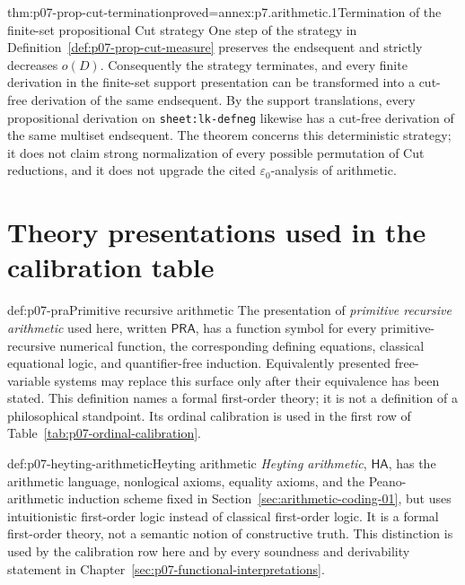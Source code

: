 \begin{hbtheorem}{thm:p07-prop-cut-termination}{proved=annex:p7.arithmetic.1}{Termination of the finite-set propositional Cut strategy}
One step of the strategy in
Definition~\ref{def:p07-prop-cut-measure} preserves the endsequent and strictly
decreases \(o(D)\).  Consequently the strategy terminates, and every finite
derivation in the finite-set support presentation can be transformed into a
cut-free derivation of the same endsequent.  By the support translations, every
propositional derivation on \texttt{sheet:lk-defneg} likewise has a cut-free
derivation of the same multiset endsequent.  The theorem concerns this
deterministic strategy; it does not claim strong normalization of every
possible permutation of Cut reductions, and it does not upgrade the cited
\(\varepsilon_0\)-analysis of arithmetic.
\end{hbtheorem}

\begingroup
\renewcommand{\sectionmark}[1]{\markright{\thesection.\ THEORY PRESENTATIONS}}
\section{Theory presentations used in the calibration table}
\endgroup
\label{sec:p07-calibration-theories}

\begin{hbdefinition}{def:p07-pra}{Primitive recursive arithmetic}
The presentation of \emph{primitive recursive arithmetic} used here, written
\(\mathsf{PRA}\), has a function symbol for every primitive-recursive
numerical function, the corresponding defining equations, classical
equational logic, and quantifier-free induction.  Equivalently presented
free-variable systems may replace this surface only after their equivalence
has been stated.  This definition names a formal first-order theory; it is not
a definition of a philosophical standpoint.  Its ordinal calibration is used
in the first row of Table~\ref{tab:p07-ordinal-calibration}.
\end{hbdefinition}

\begin{hbdefinition}{def:p07-heyting-arithmetic}{Heyting arithmetic}
\emph{Heyting arithmetic}, \(\mathsf{HA}\), has the arithmetic language,
nonlogical axioms, equality axioms, and the Peano-arithmetic induction scheme
fixed in Section~\ref{sec:arithmetic-coding-01}, but uses intuitionistic
first-order logic instead of classical first-order logic.  It is a formal
first-order theory, not a semantic notion of constructive truth.  This
distinction is used by the calibration row here and by every soundness and
derivability statement in Chapter~\ref{sec:p07-functional-interpretations}.
\end{hbdefinition}

